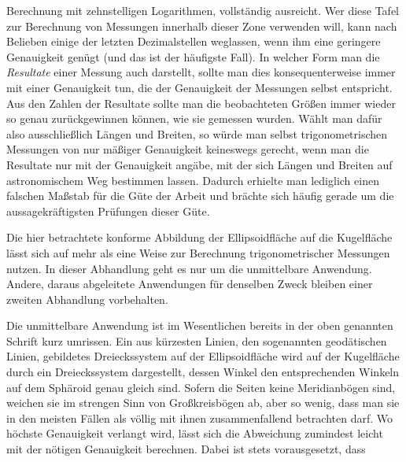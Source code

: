 %
Berechnung mit zehnstelligen Logarithmen, vollständig ausreicht. Wer diese Tafel zur Berechnung von Messungen innerhalb dieser Zone verwenden will, kann nach Belieben einige der letzten Dezimalstellen weglassen, wenn ihm eine geringere Genauigkeit genügt (und das ist der häufigste Fall). In welcher Form man die \textit{Resultate} einer Messung auch darstellt, sollte man dies konsequenterweise immer mit einer Genauigkeit tun, die der Genauigkeit der Messungen selbst entspricht. Aus den Zahlen der Resultate sollte man die \mbox{beobachteten} Größen immer wieder so genau zurückgewinnen können, wie sie gemessen wurden. Wählt man dafür also ausschließlich Längen und Breiten, so würde man selbst trigonometrischen Messungen von nur mäßiger Genauigkeit keineswegs gerecht, wenn man die Resultate nur mit der Genauigkeit angäbe, mit der sich Längen und Breiten auf astronomischem Weg bestimmen lassen. Dadurch erhielte man lediglich einen falschen Maßstab für die Güte der Arbeit und brächte sich häufig gerade um die aussagekräftigsten Prüfungen dieser Güte.

\indent Die hier betrachtete konforme Abbildung der Ellipsoidfläche auf die Kugelfläche lässt sich auf mehr als eine Weise zur Berechnung trigonometrischer Messungen nutzen. In dieser Abhandlung geht es nur um die unmittelbare Anwendung. Andere, daraus abgeleitete Anwendungen für denselben Zweck bleiben einer zweiten Abhandlung vorbehalten.

Die unmittelbare Anwendung ist im Wesentlichen bereits in der oben genannten Schrift kurz umrissen. Ein aus kürzesten Linien, den sogenannten geodätischen Linien, gebildetes Dreieckssystem auf der Ellipsoidfläche wird auf der Kugelfläche durch ein Dreieckssystem dargestellt, dessen Winkel den entsprechenden Winkeln auf dem Sphäroid genau gleich sind. Sofern die Seiten keine Meridianbögen sind, weichen sie im strengen Sinn von Großkreisbögen ab, aber so wenig, dass man sie in den meisten Fällen als völlig mit ihnen zusammenfallend betrachten darf. Wo höchste Genauigkeit verlangt wird, lässt sich die Abweichung zumindest leicht mit der nötigen Genauigkeit berechnen. Dabei ist stets vorausgesetzt, dass
